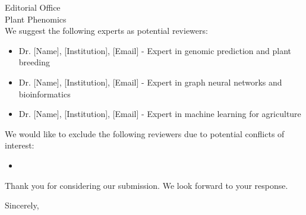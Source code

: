 \documentclass[11pt,a4paper]{letter}
\begin{document}
\begin{letter}{Editorial Office\\
Plant Phenomics\\
}
We suggest the following experts as potential reviewers:
\begin{itemize}
    \item Dr. [Name], [Institution], [Email] - Expert in genomic prediction and plant breeding
    \item Dr. [Name], [Institution], [Email] - Expert in graph neural networks and bioinformatics
    \item Dr. [Name], [Institution], [Email] - Expert in machine learning for agriculture
\end{itemize}

We would like to exclude the following reviewers due to potential conflicts of interest:
\begin{itemize}
    \item [Name and reason]
\end{itemize}

Thank you for considering our submission. We look forward to your response.

\closing{Sincerely,}

\end{letter}
\end{document}
